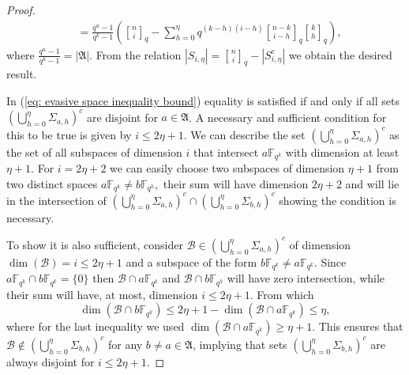 \documentclass[10pt,a4paper]{amsart}
\newcommand{\Fqk}{\mathbb{F}_{q^k}}
\newcommand{\calB}{\mathcal{B}}
\newcommand{\gbinom}[2]{\genfrac{[}{]}{0pt}{}{#1}{#2}}
\begin{document}
\begin{proof}
\begin{equation}
\begin{aligned}
            &=\frac{q^n-1}{q^k-1}\left(\gbinom{n}{i}_q-\sum_{h=0}^\eta q^{(k-h)(i-h)}\gbinom{n-k}{i-h}_q\gbinom{k}{h}_q\right),
        \end{aligned}
    \end{equation}
    where $\frac{q^n - 1}{q^k - 1} = |\mathfrak{A}|.$
    From the relation $|S_{i,\eta}| = \gbinom{n}{i}_q -  |S_{i,\eta}^c| $ we obtain the desired result.
    \par In (\ref{eq: evasive space inequality bound}) equality is satisfied if and only if all sets $\left(\bigcup_{h=0}^\eta\Sigma_{a,h}\right)^c$ are disjoint for $a \in \mathfrak{A}$.
    A necessary and sufficient condition for this to be true is given by $i \leq 2 \eta + 1$.
    We can describe the set $\left(\bigcup_{h=0}^\eta\Sigma_{a,h}\right)^c$ as the set of all subspaces of dimension $i$ that intersect $a \Fqk$ with dimension at least $\eta + 1$.
    For $i = 2 \eta + 2$ we can easily choose two subspaces of dimension $\eta + 1$ from two distinct spaces $a \Fqk \neq b \Fqk,$ their sum will have dimension $2 \eta + 2$ and will lie in the intersection of $\left(\bigcup_{h=0}^\eta\Sigma_{a,h}\right)^c \cap \left(\bigcup_{h=0}^\eta\Sigma_{b,h}\right)^c$ showing the condition is necessary.
    
    To show it is also sufficient, consider $\calB \in \left(\bigcup_{h=0}^\eta\Sigma_{a,h}\right)^c$ of dimension $\dim(\calB) = i \leq 2 \eta + 1$ and a subspace of the form $b \Fqk \neq a \Fqk$.
    Since $a \Fqk \cap b \Fqk = \{0\}$ then $\calB \cap a \Fqk$ and $\calB \cap b \Fqk$ will have zero intersection, while their sum will have, at most, dimension $i \leq 2\eta + 1$.
    From which
    \[
      \dim(\calB \cap b \Fqk) \leq  2 \eta + 1  - \dim(\calB \cap  a\Fqk) \leq \eta, 
    \]
    where for the last inequality we used $\dim(\calB \cap a \Fqk) \geq \eta + 1.$
    This ensures that $\calB \notin \left(\bigcup_{h=0}^\eta\Sigma_{b,h}\right)^c$ for any $b \neq a \in \mathfrak{A}$, implying that sets $\left(\bigcup_{h=0}^\eta\Sigma_{b,h}\right)^c$ are always disjoint for $i \leq 2 \eta +1$.
    \end{proof}
\end{document}
